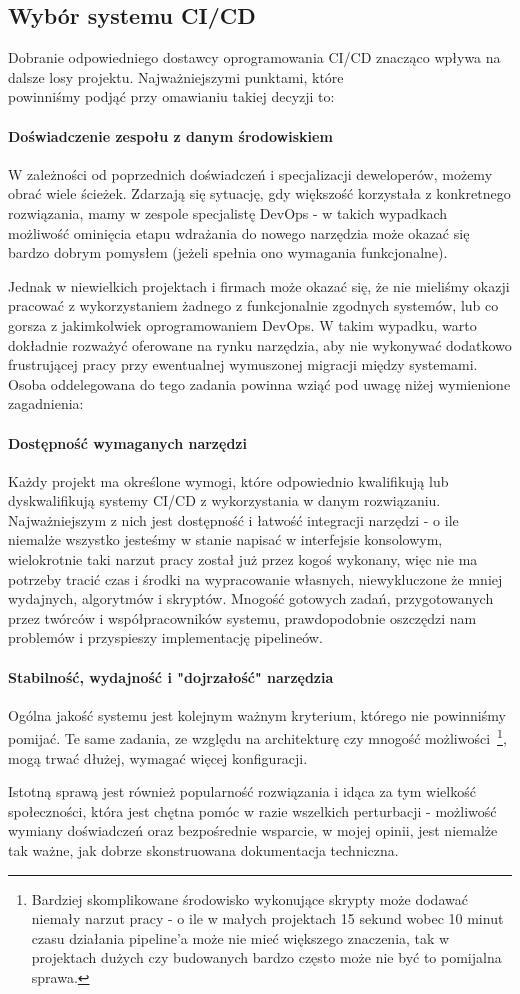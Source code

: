 \subsection{Wybór systemu CI/CD}

Dobranie odpowiedniego dostawcy oprogramowania CI/CD znacząco wpływa 
na dalsze losy projektu. Najważniejszymi punktami, które \\
powinniśmy podjąć przy omawianiu takiej decyzji to:


\paragraph{Doświadczenie zespołu z danym środowiskiem} 
W zależności od poprze\-dnich doświadczeń i specjalizacji deweloperów, 
możemy obrać wiele ścieżek. Zdarzają się sytuację, gdy większość korzystała 
z konkretnego rozwiązania, mamy w zespole specjalistę DevOps 
- w takich wypadkach możliwość ominięcia etapu wdrażania do nowego narzędzia 
może okazać się bardzo dobrym pomysłem (jeżeli spełnia ono wymagania funkcjonalne).

Jednak w niewielkich projektach i firmach może okazać się, że nie 
mieliśmy okazji pracować z wykorzy\-staniem żadnego z funkcjonalnie zgodnych 
systemów, lub co gorsza z jakimkolwiek oprogramowaniem DevOps. 
W takim wypadku, warto dokładnie rozważyć oferowane na rynku narzędzia, 
aby nie wykonywać dodatkowo frustrującej pracy przy ewentualnej wymuszonej 
migracji między systemami. Osoba oddelegowana do tego zadania powinna wziąć pod 
uwagę niżej wymienione zagadnienia:


\paragraph{Dostępność wymaganych narzędzi}
Każdy projekt ma określone wymogi, które odpowiednio kwalifikują lub 
dyskwalifikują systemy CI/CD z wykorzystania w danym rozwiązaniu.
Najważniejszym z nich jest dostępność i łatwość integracji narzędzi - 
o ile niemalże wszystko jesteśmy w stanie napisać w interfejsie konsolowym, 
wielokrotnie taki narzut pracy został już przez kogoś wykonany, więc nie ma 
potrzeby tracić czas i środki na wypracowanie własnych, niewykluczone że mniej 
wydajnych, algorytmów i skryptów. Mnogość gotowych zadań, przygotowanych 
przez twórców i współpracowników systemu, prawdopodobnie oszczędzi nam 
problemów i przyspieszy implementację pipelineów.


\paragraph{Stabilność, wydajność i "dojrzałość" narzędzia}
Ogólna jakość systemu jest kolejnym ważnym kryterium, którego nie powinniśmy 
pomijać. Te same zadania, ze względu na architekturę czy mnogość możliwości~\footnote{%
    Bardziej skomplikowane środowisko wykonujące skrypty może dodawać niemały narzut 
    pracy - o ile w małych projektach 15 sekund wobec 10 minut czasu działania pipeline'a może 
    nie mieć większego znaczenia, tak w projektach dużych czy budowanych bardzo często 
    może nie być to pomijalna sprawa.
}, 
mogą trwać dłużej, wymagać więcej konfiguracji. 

Istotną sprawą jest również popularność rozwiązania i idąca za tym wielkość społeczności, 
która jest chętna pomóc w razie wszelkich perturbacji - możliwość wymiany 
doświadczeń oraz bezpośrednie wsparcie, w mojej opinii, jest niemalże tak ważne, 
jak dobrze skonstruowana dokumentacja techniczna.
